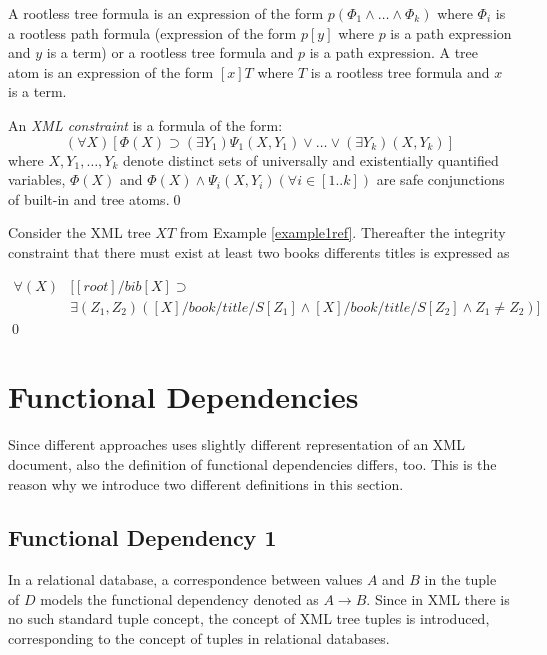 A rootless tree formula is an expression of the form $p(\Phi_1 \land \dots \land \Phi_k)$ where $\Phi_i$ is a rootless path formula (expression of the form $p[y]$ where $p$ is a path expression and $y$ is a term) or a rootless tree formula and $p$ is a path expression. A tree atom is an expression of the form $[x]T$ where $T$ is a rootless tree formula and $x$ is a term.

\begin{define}\label{integConstr}
An {\sl XML constraint} is a formula of the form: $$(\forall X)[\Phi(X)\supset (\exists Y_1)\Psi_1(X,Y_1) \lor \dots \lor (\exists Y_k)(X,Y_k)]$$
where $X,Y_1,\dots, Y_k$ denote distinct sets of universally and existentially quantified variables, $\Phi(X)$ and $\Phi(X) \land \Psi_i(X, Y_i) (\forall i \in [1..k])$ are safe conjunctions of built-in and tree atoms.\qed
\end{define}

\begin{example}
Consider the XML tree $XT$ from Example \ref{example1ref}. Thereafter the integrity constraint that there must exist at least two books differents titles is expressed as

\begin{align*}
\forall(X)&[[root]/bib[X] \supset\\
&\exists(Z_1, Z_2)([X]/book/title/S[Z_1] \land [X]/book/title/S[Z_2] \land Z_1 \not = Z_2)]
\end{align*}\qed
\end{example}

\section{Functional Dependencies}

Since different approaches uses slightly different representation of an XML document, also the definition of functional dependencies differs, too. This is the reason why we introduce two different definitions in this section.

\subsection{Functional Dependency 1}

In a relational database, a correspondence between values $A$ and $B$ in the tuple of $D$ models the functional dependency denoted as $A \rightarrow B$. Since in XML there is no such standard tuple concept, the concept of XML tree tuples is introduced, corresponding to the concept of tuples in relational databases.

